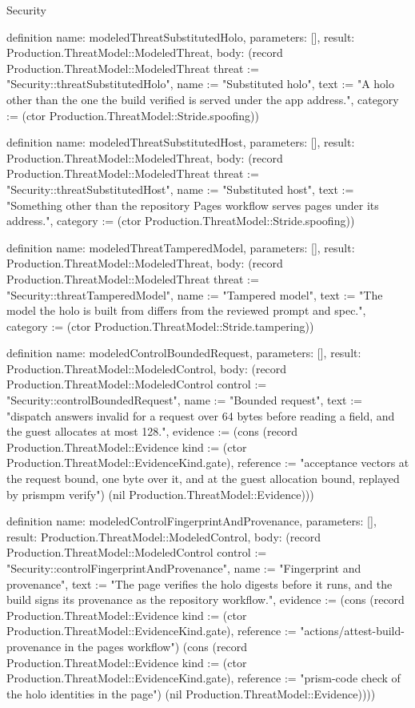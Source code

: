 \begin{lexlean}{Security}
\begin{semanticmodule}
definition{
  name: modeledThreatSubstitutedHolo,
  parameters: [],
  result: Production.ThreatModel::ModeledThreat,
  body: (record Production.ThreatModel::ModeledThreat {threat := "Security::threatSubstitutedHolo", name := "Substituted holo", text := "A holo other than the one the build verified is served under the app address.", category := (ctor Production.ThreatModel::Stride.spoofing)})
}

definition{
  name: modeledThreatSubstitutedHost,
  parameters: [],
  result: Production.ThreatModel::ModeledThreat,
  body: (record Production.ThreatModel::ModeledThreat {threat := "Security::threatSubstitutedHost", name := "Substituted host", text := "Something other than the repository Pages workflow serves pages under its address.", category := (ctor Production.ThreatModel::Stride.spoofing)})
}

definition{
  name: modeledThreatTamperedModel,
  parameters: [],
  result: Production.ThreatModel::ModeledThreat,
  body: (record Production.ThreatModel::ModeledThreat {threat := "Security::threatTamperedModel", name := "Tampered model", text := "The model the holo is built from differs from the reviewed prompt and spec.", category := (ctor Production.ThreatModel::Stride.tampering)})
}

definition{
  name: modeledControlBoundedRequest,
  parameters: [],
  result: Production.ThreatModel::ModeledControl,
  body: (record Production.ThreatModel::ModeledControl {control := "Security::controlBoundedRequest", name := "Bounded request", text := "dispatch answers invalid for a request over 64 bytes before reading a field, and the guest allocates at most 128.", evidence := (cons (record Production.ThreatModel::Evidence {kind := (ctor Production.ThreatModel::EvidenceKind.gate), reference := "acceptance vectors at the request bound, one byte over it, and at the guest allocation bound, replayed by prismpm verify"}) (nil Production.ThreatModel::Evidence))})
}

definition{
  name: modeledControlFingerprintAndProvenance,
  parameters: [],
  result: Production.ThreatModel::ModeledControl,
  body: (record Production.ThreatModel::ModeledControl {control := "Security::controlFingerprintAndProvenance", name := "Fingerprint and provenance", text := "The page verifies the holo digests before it runs, and the build signs its provenance as the repository workflow.", evidence := (cons (record Production.ThreatModel::Evidence {kind := (ctor Production.ThreatModel::EvidenceKind.gate), reference := "actions/attest-build-provenance in the pages workflow"}) (cons (record Production.ThreatModel::Evidence {kind := (ctor Production.ThreatModel::EvidenceKind.gate), reference := "prism-code check of the holo identities in the page"}) (nil Production.ThreatModel::Evidence)))})
}


\end{semanticmodule}
\end{lexlean}

